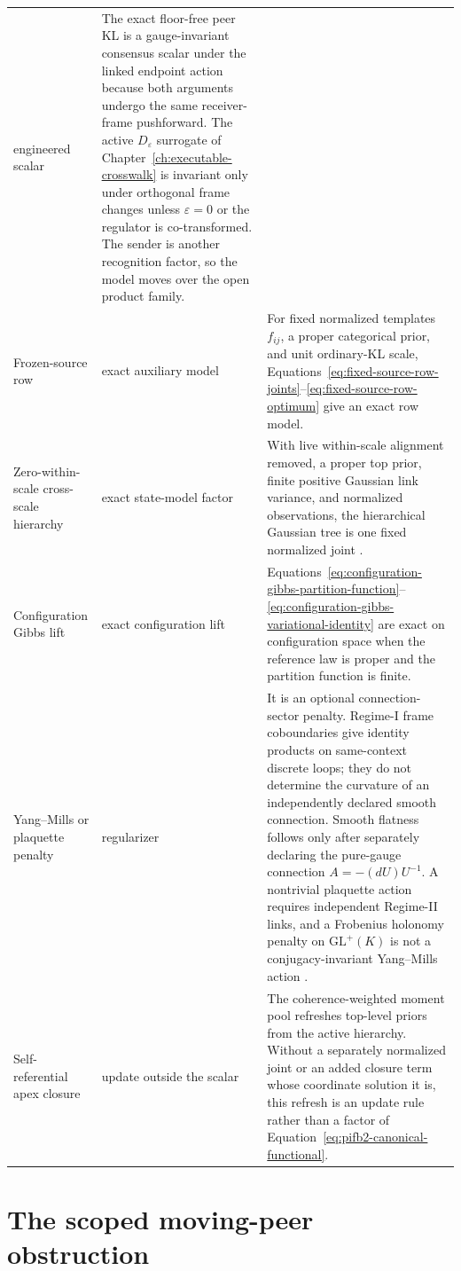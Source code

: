 \begin{longtable}{>{\raggedright\arraybackslash}p{}>{\raggedright\arraybackslash}p{}>{\raggedright\arraybackslash}p{}}
engineered scalar &
The exact floor-free peer KL is a gauge-invariant consensus scalar under the linked endpoint action because both arguments undergo the same receiver-frame pushforward. The active \(D_\varepsilon\) surrogate of Chapter~\ref{ch:executable-crosswalk} is invariant only under orthogonal frame changes unless \(\varepsilon=0\) or the regulator is co-transformed. The sender is another recognition factor, so the model moves over the open product family.\\
Frozen-source row &
exact auxiliary model &
For fixed normalized templates \(f_{ij}\), a proper categorical prior, and unit ordinary-KL scale, Equations~\eqref{eq:fixed-source-row-joints}--\eqref{eq:fixed-source-row-optimum} give an exact row model.\\
Zero-within-scale cross-scale hierarchy &
exact state-model factor &
With live within-scale alignment removed, a proper top prior, finite positive Gaussian link variance, and normalized observations, the hierarchical Gaussian tree is one fixed normalized joint \citep{Lauritzen1996}.\\
Configuration Gibbs lift &
exact configuration lift &
Equations~\eqref{eq:configuration-gibbs-partition-function}--\eqref{eq:configuration-gibbs-variational-identity} are exact on configuration space when the reference law is proper and the partition function is finite.\\
Yang--Mills or plaquette penalty &
regularizer &
It is an optional connection-sector penalty. Regime-I frame coboundaries give identity products on same-context discrete loops; they do not determine the curvature of an independently declared smooth connection. Smooth flatness follows only after separately declaring the pure-gauge connection \(A=-(dU)U^{-1}\). A nontrivial plaquette action requires independent Regime-II links, and a Frobenius holonomy penalty on \(\mathrm{GL}^{+}(K)\) is not a conjugacy-invariant Yang--Mills action \citep{Yang1954,Nakahara2003}.\\
Self-referential apex closure &
update outside the scalar &
The coherence-weighted moment pool refreshes top-level priors from the active hierarchy. Without a separately normalized joint or an added closure term whose coordinate solution it is, this refresh is an update rule rather than a factor of Equation~\eqref{eq:pifb2-canonical-functional}.\\
\end{longtable}
\normalsize

\section{The scoped moving-peer obstruction}

